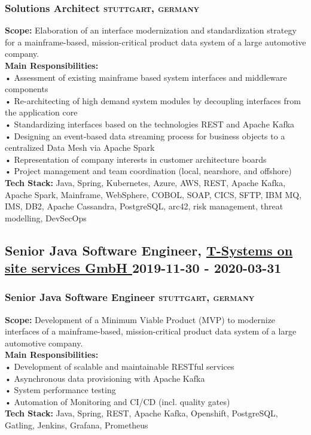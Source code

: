 \documentclass{article}
\newcommand{\rside}[1]{\hfill \normalfont\scshape\MakeLowercase{#1}}
\begin{document}
\subsubsection{ Solutions Architect \rside{ Stuttgart, Germany } }
\begin{flushleft}
\textbf{Scope:} Elaboration of an interface modernization and standardization strategy for a mainframe-based, mission-critical product data system of a large automotive company.\\[1em]\textbf{Main Responsibilities:}\\• Assessment of existing mainframe based system interfaces and middleware components\\• Re-architecting of high demand system modules by decoupling interfaces from the application core\\• Standardizing interfaces based on the technologies REST and Apache Kafka\\• Designing an event-based data streaming process for business objects to a centralized Data Mesh via Apache Spark\\• Representation of company interests in customer architecture boards\\• Project management and team coordination (local, nearshore, and offshore)\\[1em]\textbf{Tech Stack:} Java, Spring, Kubernetes, Azure, AWS, REST, Apache Kafka, Apache Spark, Mainframe, WebSphere, COBOL, SOAP, CICS, SFTP, IBM MQ, IMS, DB2,  Apache Cassandra, PostgreSQL, arc42, risk management, threat modelling, DevSecOps
\end{flushleft}

\subsection{ Senior Java Software Engineer, \href{ https://www.linkedin.com/company/t-systems-on-site-services-gmbh/ }{ T-Systems on site services GmbH } \rside{ 2019-11-30 - 2020-03-31 } }
\subsubsection{ Senior Java Software Engineer \rside{ Stuttgart, Germany } }
\begin{flushleft}
\textbf{Scope:} Development of a Minimum Viable Product (MVP) to modernize interfaces of a mainframe-based, mission-critical product data system of a large automotive company.\\[1em]\textbf{Main Responsibilities:}\\• Development of scalable and maintainable RESTful services\\• Asynchronous data provisioning with Apache Kafka\\• System performance testing\\• Automation of Monitoring and CI/CD (incl. quality gates)\\[1em]\textbf{Tech Stack:} Java, Spring, REST, Apache Kafka, Openshift, PostgreSQL, Gatling, Jenkins, Grafana, Prometheus
\end{flushleft}
\end{document}
